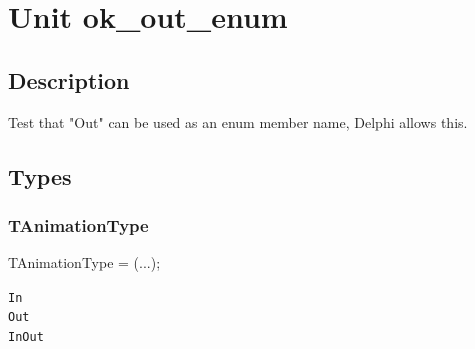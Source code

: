 \documentclass{report}
\begin{document}
\newlength{\tmplength}
\chapter{Unit ok{\_}out{\_}enum}
\section{Description}
Test that "Out" can be used as an enum member name, Delphi allows this.
\section{Types}
\subsection*{TAnimationType}
\begin{list}{}{
\setlength{\itemindent}{0cm}
\setlength{\listparindent}{0cm}
\setlength{\leftmargin}{\evensidemargin}
\addtolength{\leftmargin}{\tmplength}
\settowidth{\labelsep}{X}
\addtolength{\leftmargin}{\labelsep}
\setlength{\labelwidth}{\tmplength}
}
\begin{flushleft}
\item[\textbf{Declaration}\hfill]
\begin{ttfamily}
TAnimationType = (...);\end{ttfamily}


\end{flushleft}
\par
\item[\textbf{Description}]
 \item[\textbf{Values}]
\begin{description}
\item[\texttt{In}]  
\item[\texttt{Out}]  
\item[\texttt{InOut}]  
\end{description}


\end{list}
\end{document}
